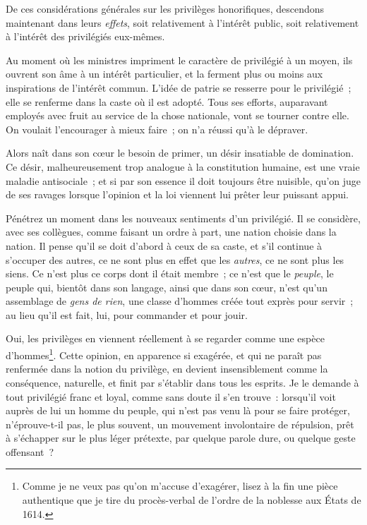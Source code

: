 \documentclass[french,twoside]{book} %
\begin{document}
De ces considérations générales sur les privilèges honorifiques, descendons maintenant dans leurs {\itshape effets}, soit relativement à l’intérêt public, soit relativement à l’intérêt des privilégiés eux-mêmes.\par
Au moment où les ministres impriment le caractère de privilégié à un moyen, ils ouvrent son âme à un intérêt particulier, et la ferment plus ou moins aux inspirations de l’intérêt commun. L’idée de patrie se resserre pour le privilégié ; elle se renferme dans la caste où il est adopté. Tous ses efforts, auparavant employés avec fruit au service de la chose nationale, vont se tourner contre elle. On voulait l’encourager à mieux faire ; on n’a réussi qu’à le dépraver.\par
Alors naît dans son cœur le besoin de primer, un désir insatiable de domination. Ce désir, malheureusement trop analogue à la constitution humaine, est une vraie maladie antisociale ; et si par son essence il doit toujours être nuisible, qu’on juge de ses ravages lorsque l’opinion et la loi viennent lui prêter leur puissant appui.\par
Pénétrez un moment dans les nouveaux sentiments d’un privilégié. Il se considère, avec ses collègues, comme faisant un ordre à part, une nation choisie dans la nation. Il pense qu’il se doit d’abord à ceux de sa caste, et s’il continue à s’occuper des autres, ce ne sont plus en effet que les {\itshape autres}, ce ne sont plus les siens. Ce n’est plus ce corps dont il était membre ; ce n’est que le {\itshape peuple}, le peuple qui, bientôt dans son langage, ainsi que dans son cœur, n’est qu’un assemblage de {\itshape gens de rien}, une classe d’hommes créée tout exprès pour servir ; au lieu qu’il est fait, lui, pour commander et pour jouir.\par
Oui, les privilèges en viennent réellement à se regarder comme une espèce d’hommes\footnote{Comme je ne veux pas qu’on m’accuse d’exagérer, lisez à la fin une pièce authentique que je tire du procès-verbal de l’ordre de la noblesse aux États de 1614.}. Cette opinion, en apparence si exagérée, et qui ne paraît pas renfermée dans la notion du privilège, en devient insensiblement comme la conséquence, naturelle, et finit par s’établir dans tous les esprits. Je le demande à tout privilégié franc et loyal, comme sans doute il s’en trouve : lorsqu’il voit auprès de lui un homme du peuple, qui n’est pas venu là pour se faire protéger, n’éprouve-t-il pas, le plus souvent, un mouvement involontaire de répulsion, prêt à s’échapper sur le plus léger prétexte, par quelque parole dure, ou quelque geste offensant ?\par
\end{document}
